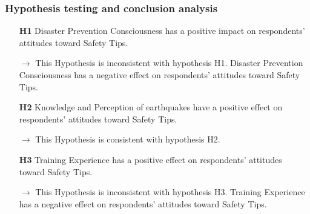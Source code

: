 \begin{table}[h]
  \caption{Discriminant Validity }
  \label{table36}
  \centering
{}
\end{table}

\subsubsection{Hypothesis testing and conclusion analysis}
\begin{itemize}
\item[\textbf{H1}] Disaster Prevention Consciousness has a positive impact on respondents' attitudes toward Safety Tips.
\item[\textbf{$\longrightarrow$}] This Hypothesis is inconsistent with hypothesis H1. Disaster Prevention Consciousness has a negative effect on respondents' attitudes toward Safety Tips.
\item[\textbf{H2}] Knowledge and Perception of earthquakes have a positive effect on respondents' attitudes toward Safety Tips.
\item[\textbf{$\longrightarrow$}] This Hypothesis is consistent with hypothesis H2. 
\item[\textbf{H3}] Training Experience has a positive effect on respondents' attitudes toward Safety Tips.
\item[\textbf{$\longrightarrow$}] This Hypothesis is inconsistent with hypothesis H3. Training Experience has a negative effect on respondents' attitudes toward Safety Tips.
\end{itemize}


